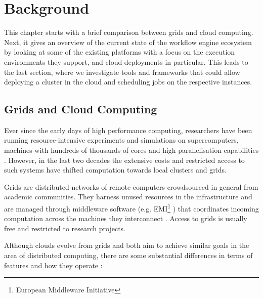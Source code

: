 \chapter{Background}

This chapter starts with a brief comparison between grids and cloud computing. Next, it gives an overview of the current state of the workflow engine ecosystem by looking at some of the existing platforms with a focus on the execution environments they support, and cloud deployments in particular. This leads to the last section, where we investigate tools and frameworks that could allow deploying a cluster in the cloud and scheduling jobs on the respective instances.

\section{Grids and Cloud Computing}

Ever since the early days of high performance computing, researchers have been running resource-intensive experiments and simulations on supercomputers, machines with hundreds of thousands of cores and high parallelisation capabilities \cite{Supercomp}. However, in the last two decades the extensive costs and restricted access to such systems have shifted computation towards local clusters and grids.

Grids are distributed networks of remote computers crowdsourced in general from academic communities. They harness unused resources in the infrastructure and are managed through middleware software (e.g. EMI\footnote{European Middleware Initiative} \cite{EMI}) that coordinates incoming computation across the machines they interconnect \cite{Myerson}. Access to grids is usually free and restricted to research projects.

Although clouds evolve from grids and both aim to achieve similar goals in the area of distributed computing, there are some substantial differences in terms of features and how they operate \cite{Juve2009, Myerson, CloudsGrids}:

